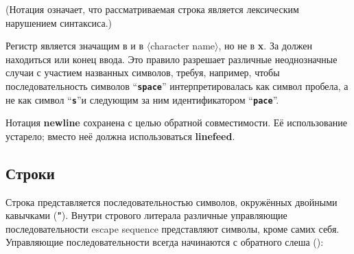 (Нотация  означает, что рассматриваемая строка является
лексическим нарушением синтаксиса.)

Регистр является значащим в {\bfseries\sharpsign\backwhack} и в
{\bfseries\sharpsign\backwhack} {\rm$\langle$character name$\rangle$}, но не в
{\bfseries\cf\sharpsign\backwhack{}x}. За  должен находиться
 или конец ввода. Это правило разрешает различные неоднозначные случаи с участием
названных символов, требуя, например, чтобы последовательность символов
``{\bfseries\tt\sharpsign\backwhack space}'' интерпретировалась как символ пробела, а не как символ
``{\bfseries\tt\sharpsign\backwhack s}''и следующим за ним идентификатором ``{\bfseries\tt pace}''.

\begin{note}
  Нотация {\bfseries\cf\sharpsign\backwhack{}newline} сохранена с целью обратной совместимости. Её
  использование устарело; вместо неё должна использоваться
  {\bfseries\cf\sharpsign\backwhack{}linefeed}.
\end{note}

\subsection{Строки}

\vest Строка представляется последовательностью символов, окружённых двойными кавычками
({\bfseries\cf "}). Внутри стрового литерала различные управляющие последовательности\mainindex
{escape sequence} представляют символы, кроме самих себя. Управляющие последовательности
всегда начинаются с обратного слеша ({\bfseries\backwhack{}}):


